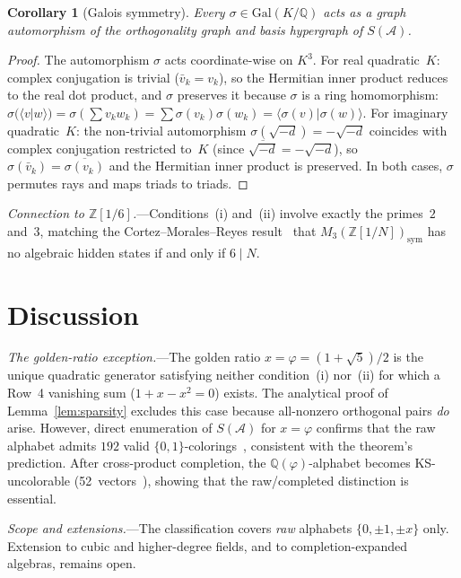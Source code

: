 \documentclass[12pt,a4paper]{article}
\newtheorem{corollary}{Corollary}
\newcommand{\Z}{\mathbb{Z}}
\newcommand{\Q}{\mathbb{Q}}
\newcommand{\Gal}{\mathrm{Gal}}
\newcommand{\braket}[2]{\langle #1 | #2 \rangle}
\begin{document}
\begin{corollary}[Galois symmetry]\label{cor:galois}
Every $\sigma \in \Gal(K/\Q)$ acts as a graph automorphism of
the orthogonality graph and basis hypergraph of $S(\mathcal{A})$.
\end{corollary}

\begin{proof}
The automorphism $\sigma$ acts coordinate-wise on $K^3$.  For real
quadratic~$K$: complex conjugation is trivial ($\bar{v}_k = v_k$),
so the Hermitian inner product reduces to the real dot product, and
$\sigma$ preserves it because $\sigma$ is a ring homomorphism:
$\sigma(\braket{v}{w}) = \sigma(\sum v_k w_k) = \sum \sigma(v_k)
\sigma(w_k) = \braket{\sigma(v)}{\sigma(w)}$.  For imaginary quadratic~$K$: the
non-trivial automorphism $\sigma(\sqrt{-d}) = -\sqrt{-d}$ coincides
with complex conjugation restricted to~$K$ (since
$\overline{\sqrt{-d}} = -\sqrt{-d}$), so $\sigma(\bar{v}_k) =
\overline{\sigma(v_k)}$ and the Hermitian inner product is preserved.
In both cases, $\sigma$ permutes rays and maps triads to triads.
\end{proof}

\smallskip\noindent\textit{Connection to $\Z[1/6]$.}---Conditions~(i)
and~(ii) involve exactly the primes~$2$ and~$3$, matching the
Cortez--Morales--Reyes result~\cite{CortezMoralesReyes2022} that
$M_3(\Z[1/N])_{\mathrm{sym}}$ has no algebraic hidden states if and
only if $6 \mid N$.

\section{Discussion}\label{sec:discussion}

\textit{The golden-ratio exception.}---The golden ratio
$x = \varphi = (1{+}\sqrt{5})/2$ is the unique quadratic generator
satisfying neither condition~(i) nor~(ii) for which a Row~4 vanishing
sum ($1 + x - x^2 = 0$) exists.  The analytical proof of
Lemma~\ref{lem:sparsity} excludes this case because all-nonzero
orthogonal pairs \emph{do} arise.  However, direct enumeration of
$S(\mathcal{A})$ for $x = \varphi$ confirms that the raw alphabet
admits $192$ valid $\{0,1\}$-colorings~\cite{Kernaghan2026islands},
consistent with the theorem's prediction.  After cross-product
completion, the $\Q(\varphi)$-alphabet becomes KS-uncolorable
(52~vectors~\cite{Kernaghan2026islands}), showing that the raw/completed
distinction is essential.

\textit{Scope and extensions.}---The classification covers \emph{raw}
alphabets $\{0,\pm 1,\pm x\}$ only.  Extension to cubic and
higher-degree fields, and to completion-expanded algebras, remains open.
\end{document}
